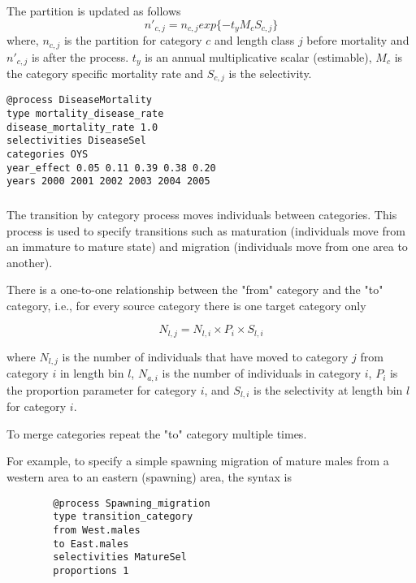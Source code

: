 The partition is updated as follows
\begin{equation}
	n'_{c,j} = n_{c,j}  exp\{-t_y M_{c} S_{c,j} \}
\end{equation}
%
where, \(n_{c,j}\) is the partition for category \(c\) and length class \(j\) before mortality and \(n'_{c,j}\)  is after the process. \(t_y\) is an annual multiplicative scalar (estimable), \(M_{c}\) is the category specific mortality rate and \(S_{c,j}\) is the selectivity.
 
{\small{\begin{verbatim}
@process DiseaseMortality
type mortality_disease_rate
disease_mortality_rate 1.0
selectivities DiseaseSel 
categories OYS
year_effect 0.05 0.11 0.39 0.38 0.20 
years 2000 2001 2002 2003 2004 2005 
		\end{verbatim}}}
\subsubsection{}\label{sec:Process-Length-TransitionCategory}
The transition by category process moves individuals between categories. This process is used to specify transitions such as maturation (individuals move from an immature to mature state) and migration (individuals move from one area to another).

There is a one-to-one relationship between the "from" category and the "to" category, i.e., for every source category there is one target category only

\begin{equation}
N_{l,j} = N_{l,i} \times P_i \times S_{l,i}
\end{equation}

where $N_{l,j}$ is the number of individuals that have moved to category $j$ from category $i$ in length bin $l$, $N_{a,i}$ is the number of individuals in category $i$, $P_i$ is the proportion parameter for category $i$, and $S_{l,i}$ is the selectivity at length bin $l$ for category $i$.

To merge categories repeat the "to" category multiple times.

For example, to specify a simple spawning migration of mature males from a western area to an eastern (spawning) area, the syntax is

{\small{\begin{verbatim}
		@process Spawning_migration
		type transition_category
		from West.males
		to East.males
		selectivities MatureSel
		proportions 1
		\end{verbatim}}}

